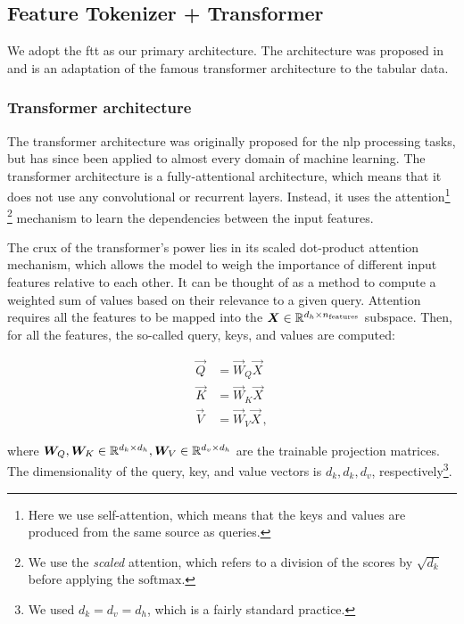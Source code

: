 \subsection{Feature Tokenizer + Transformer}
\label{sec:ftt}

We adopt the \gls{ftt} as our primary architecture. The architecture was proposed in \cite{ft-transformer} and is an
adaptation of the famous transformer architecture \cite{transformer} to the tabular data.

\subsubsection{Transformer architecture}

The transformer architecture was originally proposed for the \gls{nlp} processing tasks, but has since been applied
to almost every domain of machine learning. The transformer architecture is a fully-attentional architecture, which
means that it does not use any convolutional \cite{convolutional} or recurrent \cite{recurrent} layers. Instead, it uses
the attention\footnote{Here we use self-attention, which means that the keys and values are produced from the same
    source as queries.}
\footnote{We use the \emph{scaled} attention, which refers to a division of the scores by $\sqrt{d_k}$ before applying
    the $\text{softmax}$.}
mechanism \cite{attention} to learn the dependencies between the input features.







The crux of the transformer's power lies in its scaled dot-product attention mechanism, which allows the model to weigh
the importance of different input features relative to each other. It can be thought of as a method to compute a
weighted sum of values based on their relevance to a given query. Attention requires all the features to be mapped into
the ${\boldsymbol{X}} \in \mathbb{R}^{d_h \times n_\text{features}}$ subspace. Then, for all the features, the so-called
query, keys, and values are computed:

\begin{align}
    \vec{Q} & = \vec{W}_Q \vec{X}    \\
    \vec{K} & = \vec{W}_K \vec{X}    \\
    \vec{V} & = \vec{W}_V \vec{X}\,,
\end{align}

where ${\boldsymbol{W}}_Q, {\boldsymbol{W}}_K \in \mathbb{R}^{d_k \times d_h}, {\boldsymbol{W}}_V \in \mathbb{R}^{d_v \times d_h}$ are the trainable projection
matrices. The dimensionality of the query, key, and value vectors is $d_k, d_k, d_v$, respectively\footnote{We used $d_k
        = d_v = d_h$, which is a fairly standard practice.}.

